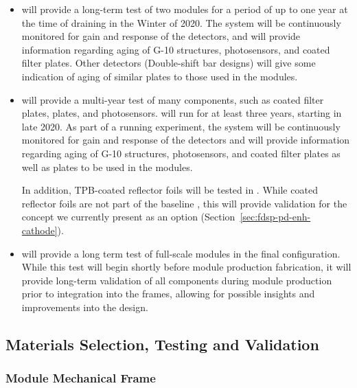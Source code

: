 \begin{itemize}

    \item {} will provide a long-term test of two  modules for a period of up to one year at the time of draining in the Winter of 2020.  The system will be continuously monitored for gain and response of the detectors, and will provide information regarding aging of \frfour G-10 structures, photosensors, and coated filter plates.  Other  detectors (Double-shift bar designs) will give some indication of aging of similar  plates to those used in the  modules.

    \item {} will provide a multi-year test of many  components, such as coated filter plates,  plates, and photosensors.   will run for at least three years, starting in late 2020.  As part of a running experiment, the system will be continuously monitored for gain and response of the detectors and will provide information regarding aging of \frfour G-10 structures, photosensors, and coated filter plates as well as  plates to be used in the  modules.
    
    In addition, TPB-coated reflector foils will be tested in . While coated reflector foils are not part of the baseline , this will provide validation for the concept we currently present as an option (Section~\ref{sec:fdsp-pd-enh-cathode}).
    
    \item {} will provide a long term test of full-scale  modules in the final  configuration. While this test will begin shortly before   module production fabrication, it will provide long-term validation of all  components during module production prior to integration into the  frames, allowing for possible insights and improvements into the  design.

\end{itemize}


\subsection{Materials Selection, Testing and Validation}

\subsubsection{ Module Mechanical Frame}

